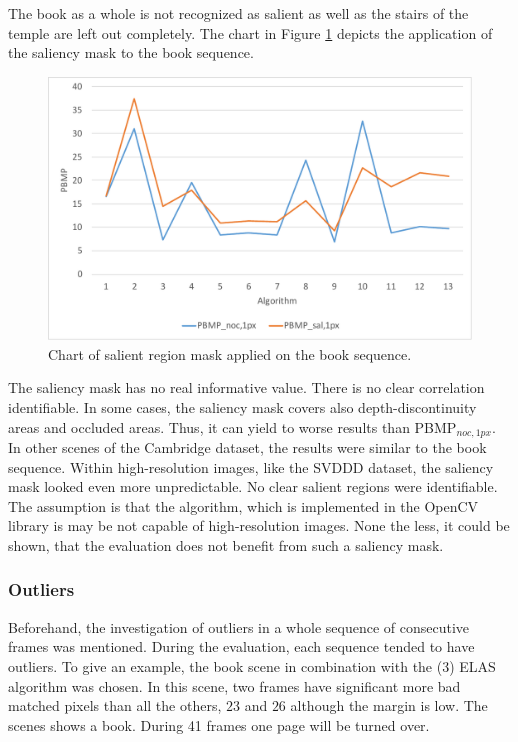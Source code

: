 \noindent The book as a whole is not recognized as salient as well as the stairs of the temple are left out completely.
The chart in Figure \ref{fig:eval-plots-pbmp-sal} depicts the application of the saliency mask to the book sequence.

\begin{figure}[h!]
\centering
\includegraphics[width=1.0\textwidth]{src/images/evaluation/plots/01-book-pbmp-sal-1.pdf}
\caption[Chart of salient region mask]{Chart of salient region mask applied on the book sequence.}
\label{fig:eval-plots-pbmp-sal}
\end{figure}

\noindent The saliency mask has no real informative value.
There is no clear correlation identifiable.
In some cases, the saliency mask covers also depth-discontinuity areas and occluded areas.
Thus, it can yield to worse results than PBMP$_{noc,1px}$.
In other scenes of the Cambridge dataset, the results were similar to the book sequence.
Within high-resolution images, like the SVDDD dataset, the saliency mask looked even more unpredictable.
No clear salient regions were identifiable.
The assumption is that the algorithm, which is implemented in the OpenCV library is may be not capable of high-resolution images.
None the less, it could be shown, that the evaluation does not benefit from such a saliency mask.

\subsubsection{Outliers}

Beforehand, the investigation of outliers in a whole sequence of consecutive frames was mentioned.
During the evaluation, each sequence tended to have outliers.
To give an example, the book scene in combination with the (3) ELAS algorithm was chosen.
In this scene, two frames have significant more bad matched pixels than all the others, $23$ and $26$ although the margin is low.
The scenes shows a book.
During 41 frames one page will be turned over.

